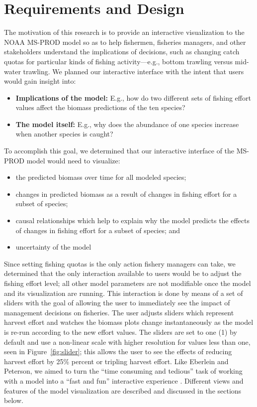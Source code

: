 \chapter{Requirements and Design}

The motivation of this research is to provide an interactive visualization to the NOAA MS-PROD model so as to help fishermen, fisheries managers, and other stakeholders understand the implications of decisions, such as changing catch quotas for particular kinds of fishing activity---e.g., bottom trawling versus mid-water trawling.  We planned our interactive interface with the intent that users would gain insight into:

\begin{itemize}
	\item \textbf{Implications of the model:}  E.g., how do two different sets of fishing effort values affect the biomass predictions of the ten species?
	\item \textbf{The model itself:}  E.g., why does the abundance of one species increase when another species is caught? 
\end{itemize} 

To accomplish this goal, we determined that our interactive interface of the MS-PROD model would need to visualize:

\begin{itemize}
	\item the predicted biomass over time for all modeled species;
	\item changes in predicted biomass as a result of changes in fishing effort for a subset of species;
	\item causal relationships which help to explain why the model predicts the effects of changes in fishing effort for a subset of species; and
	\item uncertainty of the model
\end{itemize} 

Since setting fishing quotas is the only action fishery managers can take, we determined that the only interaction available to users would be to adjust the fishing effort level; all other model parameters are not modifiable once the model and its visualization are running.  This interaction is done by means of a set of sliders with the goal of allowing the user to immediately see the impact of management decisions on fisheries.  The user adjusts sliders which represent harvest effort and watches the biomass plots change instantaneously as the model is re-run according to the new effort values.  The sliders are set to one (1) by default and use a non-linear scale with higher resolution for values less than one, seen in Figure~\ref{fig:slider}; this allows the user to see the effects of reducing harvest effort by 25\% percent or tripling harvest effort.  Like Eberlein and Peterson, we aimed to turn the ``time consuming and tedious'' task of working with a model into a ``fast and fun'' interactive experience \citeyearpar{eberlein1992}.  Different views and features of the model visualization are described and discussed in the sections below.  

